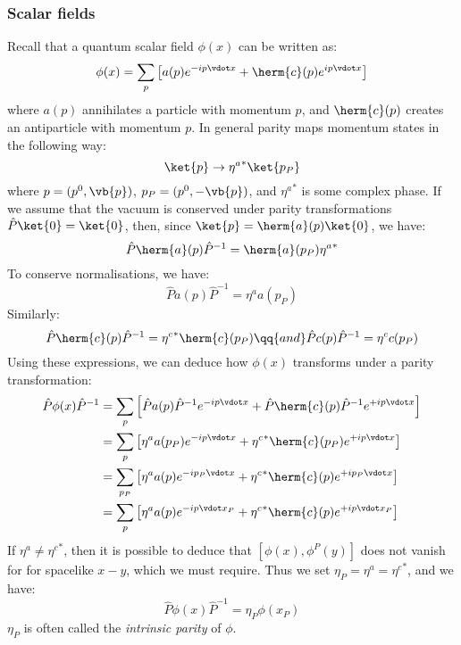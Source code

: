 \documentclass{jknotes}
\begin{document}
\subsubsection{Scalar fields}
Recall that a quantum scalar field \(\phi(x)\) can be written as:
\begin{equation}
    \phi(x) = \sum_p\left[ a(p)e^{-ip\vdot x} + \herm{c}(p)e^{ip\vdot x} \right]
\end{equation}
where \(a(p)\) annihilates a particle with momentum \(p\), and \(\herm{c}(p)\) creates an antiparticle with momentum \(p\). In general parity maps momentum states in the following way:
\begin{equation}
    \ket{p}\rightarrow{\eta^a}^*\ket{p_P}
\end{equation}
where \(p = (p^0,\vb{p})\), \(p_P = (p^0,-\vb{p})\), and \({\eta^a}^*\) is some complex phase. If we assume that the vacuum is conserved under parity transformations \(\hat{P}\ket{0} = \ket{0}\), then, since \(\ket{p}=\herm{a}(p)\ket{0}\), we have:
\begin{equation}
    \hat{P}\herm{a}(p)\hat{P}^{-1} = \herm{a}(p_P){\eta^a}^*
\end{equation}
To conserve normalisations, we have:
\begin{equation}
    \hat{P}a(p)\hat{P}^{-1} = \eta^a a(p_P)
\end{equation}
Similarly:
\begin{equation}
    \hat{P}\herm{c}(p)\hat{P}^{-1} = {\eta^c}^* \herm{c}(p_P)
    \qq{and}
    \hat{P}c(p)\hat{P}^{-1} = \eta^c c(p_P)
\end{equation}
Using these expressions, we can deduce how \(\phi(x)\) transforms under a parity transformation:
\begin{align}
    \hat{P}\phi(x)\hat{P}^{-1} 
    &= \sum_p \left[ \hat{P}a(p)\hat{P}^{-1}e^{-ip\vdot x} + \hat{P}\herm{c}(p)\hat{P}^{-1}e^{+ip\vdot x} \right] \\
    &= \sum_p \left[ \eta^aa(p_P)e^{-ip\vdot x} + {\eta^c}^*\herm{c}(p_P)e^{+ip\vdot x} \right] \\
    &= \sum_{p_P} \left[ \eta^aa(p)e^{-ip_P\vdot x} + {\eta^c}^*\herm{c}(p)e^{+ip_P\vdot x} \right] \\
    &= \sum_p \left[ \eta^aa(p)e^{-ip\vdot x_P} + {\eta^c}^*\herm{c}(p)e^{+ip\vdot x_P} \right] \\
\end{align}
If \(\eta^a \ne {\eta^c}^*\), then it is possible to deduce that \([\phi(x),\phi^P(y)]\) does not vanish for for spacelike \(x-y\), which we must require. Thus we set \(\eta_P = \eta^a = {\eta^c}^*\), and we have:
\begin{equation}
    \hat{P}\phi(x)\hat{P}^{-1} = \eta_P\phi(x_P)
\end{equation}
\(\eta_P\) is often called the \emph{intrinsic parity} of \(\phi\).
\end{document}
